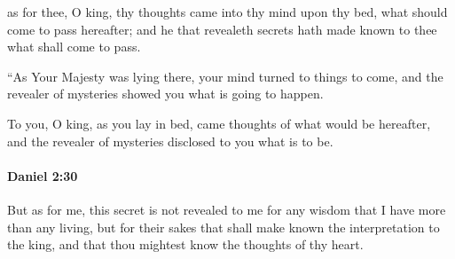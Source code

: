 			\begin{versebox}
					\item[BHS] 
					\item[LXX] 
					\item[ASV] as for thee, O king, thy thoughts came into thy mind upon thy bed, what should come to pass hereafter; and he that revealeth secrets hath made known to thee what shall come to pass.
					\item[NIV] “As Your Majesty was lying there, your mind turned to things to come, and the revealer of mysteries showed you what is going to happen.
					\item[NRSV] To you, O king, as you lay in bed, came thoughts of what would be hereafter, and the revealer of mysteries disclosed to you what is to be.
			\end{versebox}

		\paragraph{Daniel 2:30} %
			\label{DANIEL-2-30}

			But as for me, this secret is not revealed to me for any wisdom that I have more than any living, but for their sakes that shall make known the interpretation to the king, and that thou mightest know the thoughts of thy heart.

